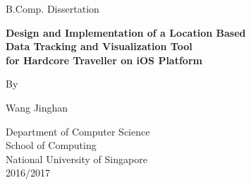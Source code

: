 \documentclass[12pt,a4paper]{article}
\begin{document}
	\begin{titlepage}
		\begin{center}
		
			B.Comp. Dissertation
			
			\vspace*{3.5cm}
			
			\fontsize{14pt}{14pt}\textbf {
			    Design and Implementation of a Location Based\\
                Data Tracking and Visualization Tool\\
                for Hardcore Traveller on iOS Platform\\
			}
			
			\vspace{4.5cm}
			
			By
			
			\vspace{0.5cm}
			
			Wang Jinghan
			
			\vfill
			
			Department of Computer Science\\
			School of Computing\\
			National University of Singapore\\
			2016/2017
			
		\end{center}
	\end{titlepage}
	
	
\end{document}
